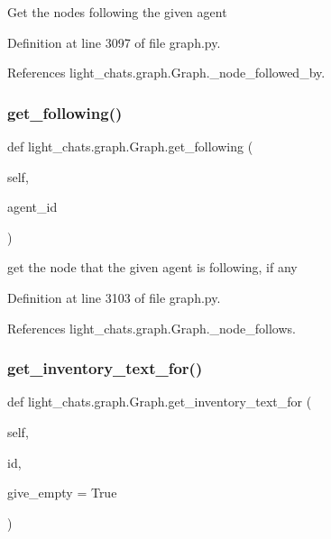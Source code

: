 \begin{DoxyVerb}Get the nodes following the given agent\end{DoxyVerb}
 

Definition at line 3097 of file graph.\+py.



References light\+\_\+chats.\+graph.\+Graph.\+\_\+node\+\_\+followed\+\_\+by.

\mbox{\label{classlight__chats_1_1graph_1_1Graph_a1f4c0ccc957a89dcec003a73553914b7}} 
\subsubsection{\texorpdfstring{get\+\_\+following()}{get\_following()}}
{\footnotesize\ttfamily def light\+\_\+chats.\+graph.\+Graph.\+get\+\_\+following (\begin{DoxyParamCaption}\item[{}]{self,  }\item[{}]{agent\+\_\+id }\end{DoxyParamCaption})}

\begin{DoxyVerb}get the node that the given agent is following, if any\end{DoxyVerb}
 

Definition at line 3103 of file graph.\+py.



References light\+\_\+chats.\+graph.\+Graph.\+\_\+node\+\_\+follows.

\mbox{\label{classlight__chats_1_1graph_1_1Graph_a8f2b0882918768e199aee89cf08bde41}} 
\subsubsection{\texorpdfstring{get\+\_\+inventory\+\_\+text\+\_\+for()}{get\_inventory\_text\_for()}}
{\footnotesize\ttfamily def light\+\_\+chats.\+graph.\+Graph.\+get\+\_\+inventory\+\_\+text\+\_\+for (\begin{DoxyParamCaption}\item[{}]{self,  }\item[{}]{id,  }\item[{}]{give\+\_\+empty = {\ttfamily True} }\end{DoxyParamCaption})}

